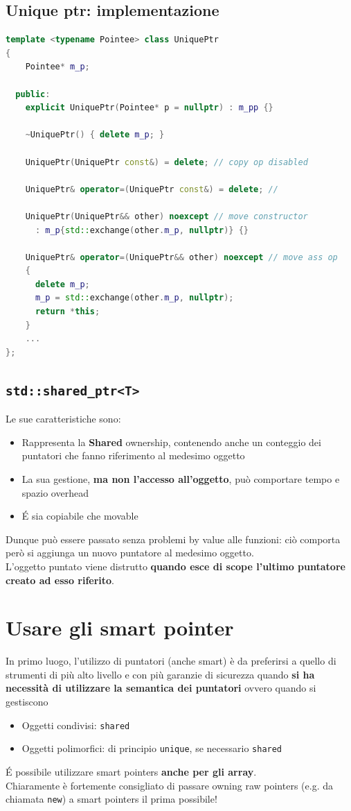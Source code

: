 \documentclass[10pt, oneside]{book}
\begin{document}
\subsection{Unique ptr: implementazione}
\begin{lstlisting}[language=C++]
template <typename Pointee> class UniquePtr
{
    Pointee* m_p;
    
  public:
    explicit UniquePtr(Pointee* p = nullptr) : m_pp {}
    
    ~UniquePtr() { delete m_p; }
    
    UniquePtr(UniquePtr const&) = delete; // copy op disabled
    
    UniquePtr& operator=(UniquePtr const&) = delete; // 
    
    UniquePtr(UniquePtr&& other) noexcept // move constructor
      : m_p{std::exchange(other.m_p, nullptr)} {}
      
    UniquePtr& operator=(UniquePtr&& other) noexcept // move ass op
    {
      delete m_p;
      m_p = std::exchange(other.m_p, nullptr);
      return *this;
    }
    ...
};
\end{lstlisting}

\subsection{\texttt{std::shared\_ptr<T>}}
Le sue caratteristiche sono:
\begin{itemize}
\item Rappresenta la \textbf{Shared} ownership, contenendo anche un conteggio dei puntatori che fanno riferimento al medesimo oggetto
\item La sua gestione, \textbf{ma non l'accesso all'oggetto}, può comportare tempo e spazio overhead
\item \'E sia copiabile che movable
\end{itemize}
Dunque può essere passato senza problemi by value alle funzioni: ciò comporta però si aggiunga un nuovo puntatore al medesimo oggetto.\\
L'oggetto puntato viene distrutto \textbf{quando esce di scope l'ultimo puntatore creato ad esso riferito}.

\section{Usare gli smart pointer}
In primo luogo, l'utilizzo di puntatori (anche smart) è da preferirsi a quello di strumenti di più alto livello e con più garanzie di sicurezza quando \textbf{si ha necessità di utilizzare la semantica dei puntatori} ovvero quando si gestiscono
\begin{itemize}
\item Oggetti condivisi: \texttt{shared}
\item Oggetti polimorfici: di principio \texttt{unique}, se necessario \texttt{shared}
\end{itemize}
\'E possibile utilizzare smart pointers \textbf{anche per gli array}.\\
Chiaramente è fortemente consigliato di passare owning raw pointers (e.g. da chiamata \texttt{new}) a smart pointers il prima possibile!
\end{document}
